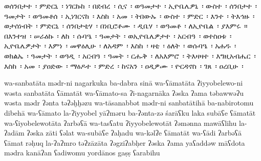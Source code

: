 
\begin{ethiopictext}
    ወሰንበታተ~፡ ምድርኒ~፡ ነገርኩከ~፡ በደብረ~፡ ሲና~፡ ወዓመታተ~፡
    ኢዮቤሌዎኒ~፡ ውስተ~፡ ሰንበታተ~፡ ዓመታት~፡ ወዓመቶሰ~፡ ኢነገርናከ~፡
    እስከ~፡ አመ~፡ ትበውኡ~፡ ውስተ~፡ ምድር~፡ እንተ~፡ ትእኅዙ~፡
    ወታሰነብት~፡ ምድርኒ~፡ ሰንበታቲሃ~፡ በነቢሮቶሙ~፡ ዲቤሃ~፡ 
    ወዓመቶ~፡ ለኢዮቤል~፡ ያእምሩ~። 
    በእንተዝ~፡ ሠራዕኩ~፡ ለከ~፡ 
    ሱባዔ~፡ ዓመታት~፡ ወኢዮቤሌዎታተ~፡ አርብዓ~፡ ወተስዐቱ~፡ ኢዮቤሌዎታት~፡
    እምነ~፡ መዋዕሊሁ~፡ ለአዳም~፡ እስከ~፡ ዛቲ~፡ ዕለት~፡ ወሱባዔ~፡
    አሐዱ~፡ ወክልኤ~፡ ዓመታት~፡ ወዓዲ~፡ አርብዓ~፡ ዓመት~፡ 
    ርሑቅ~፡ ለአእምሮ~፡ ትእዛዛተ~፡ እግዚአብሔር~፡ እስከ~፡ አመ~፡ ያዐድው~፡
    ማዕዶተ~፡ ምድረ~፡ ከናአን~፡ ዐዲዎሙ~፡ ዮርዳኖስ~፡ ገጸ~፡ ዐረቢሁ~፡
\end{ethiopictext}
\begin{transliteration}
    wa-sanbatāta mədr-ni nagarkuka ba-dabra sinā wa-ʕāmatāta
    ʔiyyobelewo-ni wəsta sanbatāta ʕāmatāt wa-ʕāmato-sa ʔi-nagarnāka
    ʔəska ʔama təbawwəʔu wəsta mədr ʔənta təʔəḫḫəzu
    wa-tāsanabbət mədr-ni sanbatātihā ba-nabirotomu dibehā
    wa-ʕāmato la-ʔiyyobel yāʔməru
    ba-ʔənta-zə śarāʕku laka
    subāʕe ʕāmatāt wa-ʕiyobelewotāta ʔarbəʕā wa-tasʕatu ʔiyyobelewotāt
    ʔəmənna mawāʕlihu la-ʔadām ʔəska zāti ʕəlat wa-subāʕe
    ʔaḥadu wa-kəlʔe ʕāmatāt wa-ʕādi ʔarbəʕā ʕāmat
    rəḥuq la-ʔaʔmro təʔzāzāta ʔəgziʔabḥer ʔəska ʔama yaʕaddəw
    māʕdota mədra kanāʔan ʕadiwomu yordānos gaṣṣ ʕarabihu

\end{transliteration}

